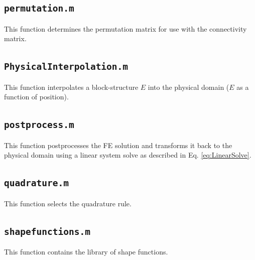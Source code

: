 \documentclass[10pt]{article}
\begin{document}
\subsection{\texttt{permutation.m}}
This function determines the permutation matrix for use with the connectivity matrix.


\subsection{\texttt{PhysicalInterpolation.m}}
This function interpolates a block-structure \(E\) into the physical domain (\(E\) as a function of position).


\subsection{\texttt{postprocess.m}}
This function postprocesses the FE solution and transforms it back to the physical domain using a linear system solve as described in Eq. \eqref{eq:LinearSolve}.


\subsection{\texttt{quadrature.m}}
This function selects the quadrature rule.


\subsection{\texttt{shapefunctions.m}}
This function contains the library of shape functions.

\end{document}
